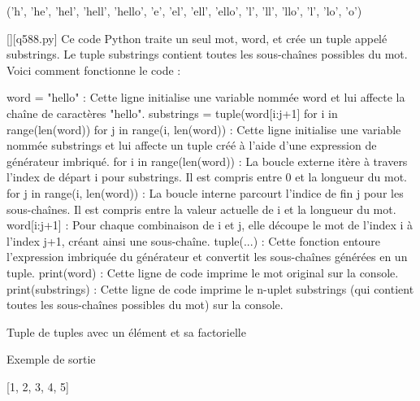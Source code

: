 ('h', 'he', 'hel', 'hell', 'hello', 'e', 'el', 'ell', 'ello', 'l', 'll', 'llo', 'l', 'lo', 'o')
        \par
        \begin{solution}
            \renewcommand{\nomfichier}{q588.py}
            \pythonfile{\chemincode \nomfichier}[][\nomfichier]
            Ce code Python traite un seul mot, word, et crée un tuple appelé substrings. Le tuple substrings contient toutes les sous-chaînes possibles du mot. Voici comment fonctionne le code :

    word = "hello" : Cette ligne initialise une variable nommée word et lui affecte la chaîne de caractères "hello".
    substrings = tuple(word[i:j+1] for i in range(len(word)) for j in range(i, len(word)) : Cette ligne initialise une variable nommée substrings et lui affecte un tuple créé à l'aide d'une expression de générateur imbriqué.
        for i in range(len(word)) : La boucle externe itère à travers l'index de départ i pour substrings. Il est compris entre 0 et la longueur du mot.
        for j in range(i, len(word)) : La boucle interne parcourt l'indice de fin j pour les sous-chaînes. Il est compris entre la valeur actuelle de i et la longueur du mot.
        word[i:j+1] : Pour chaque combinaison de i et j, elle découpe le mot de l'index i à l'index j+1, créant ainsi une sous-chaîne.
        tuple(...) : Cette fonction entoure l'expression imbriquée du générateur et convertit les sous-chaînes générées en un tuple.
    print(word) : Cette ligne de code imprime le mot original sur la console.
    print(substrings) : Cette ligne de code imprime le n-uplet substrings (qui contient toutes les sous-chaînes possibles du mot) sur la console.
        \end{solution}
        

        \question
        Tuple de tuples avec un élément et sa factorielle

Exemple de sortie

[1, 2, 3, 4, 5]

